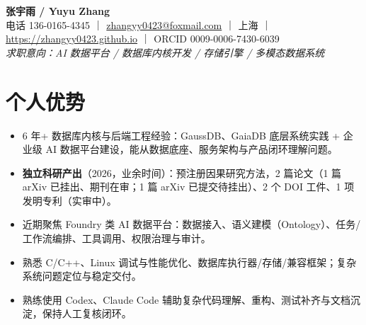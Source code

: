 \documentclass[11pt,a4paper]{article}
\begin{document}
\begin{center}{\LARGE\bfseries 张宇雨 / Yuyu Zhang}\\[2pt]
{\small 电话 136-0165-4345 ｜ \href{mailto:zhangyy0423@foxmail.com}{zhangyy0423@foxmail.com} ｜ 上海 ｜ \url{https://zhangyy0423.github.io} ｜ ORCID 0009-0006-7430-6039}\\[2pt]
{\small\itshape 求职意向：AI 数据平台 / 数据库内核开发 / 存储引擎 / 多模态数据系统}\end{center}

\section{个人优势}
\begin{itemize}
\item 6 年+ 数据库内核与后端工程经验：GaussDB、GaiaDB 底层系统实践 + 企业级 AI 数据平台建设，能从数据底座、服务架构与产品闭环理解问题。
\item \textbf{独立科研产出}（2026，业余时间）：预注册因果研究方法，2 篇论文（1 篇 arXiv 已挂出、期刊在审；1 篇 arXiv 已提交待挂出）、2 个 DOI 工件、1 项发明专利（实审中）。
\item 近期聚焦 Foundry 类 AI 数据平台：数据接入、语义建模（Ontology）、任务/工作流编排、工具调用、权限治理与审计。
\item 熟悉 C/C++、Linux 调试与性能优化、数据库执行器/存储/兼容框架；复杂系统问题定位与稳定交付。
\item 熟练使用 Codex、Claude Code 辅助复杂代码理解、重构、测试补齐与文档沉淀，保持人工复核闭环。
\end{itemize}
\end{document}

